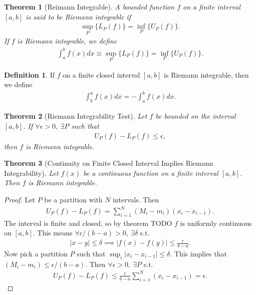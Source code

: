 \documentclass{article}
\newtheorem{theorem}{Theorem}[section]
\numberwithin{theorem}{subsection}
\numberwithin{theorem}{subsubsection}
\numberwithin{lemma}{subsection}
\numberwithin{lemma}{subsubsection}
\theoremstyle{definition}
\newtheorem{definition}{Definition}[section]
\numberwithin{definition}{subsection}
\numberwithin{definition}{subsubsection}
\begin{document}
\begin{theorem}[Reimann Integrable]
    A bounded function $f$ on a finite interval $[a,b]$ is said to be Riemann integrable if
    \begin{gather}
        \sup_{P}\{L_{P}(f)\} = \inf_{P}\{U_{P}(f)\}.
    \end{gather}
    If $f$ is Riemann integrable, we define
    \begin{gather}
        \int_{a}^{b} f(x)dx \equiv \sup_{P}\{L_{P}(f)\} = \inf_{P}\{U_{P}(f)\}.
    \end{gather}
\end{theorem}

\begin{definition}
    If $f$ on a finite closed interval $[a,b]$ is Riemann integrable, then we define
    \begin{gather}
        \int_{b}^{a}f(x)dx = -\int_{a}^{b}f(x)dx.
    \end{gather}
\end{definition}

\begin{theorem}[Riemann Integrability Test]
    Let $f$ be bounded on the interval $[a,b]$. If $\forall \epsilon > 0,\ \exists P$ such that
    \begin{gather}
        U_{P}(f) - L_{P}(f) \leq \epsilon,
    \end{gather}
    then $f$ is Riemann integrable.
\end{theorem}

\begin{theorem}[Continuity on Finite Closed Interval Implies Riemann Integrability]
    Let $f(x)$ be a continuous function on a finite interval $[a,b]$. Then $f$ is Riemann integrable.
\end{theorem}
\begin{proof}
    Let $P$ be a partition with $N$ intervals. Then 
    \begin{gather}
        U_{P}(f) - L_{P}(f) = \sum_{i=1}^{N}(M_{i}-m_{i})(x_{i}-x_{i-1}).
    \end{gather}
    The interval is finite and closed, so by theorem TODO $f$ is uniformly continuous on $[a,b]$. This means $\forall \epsilon/(b-a)>0,\ \exists \delta$ s.t.
    \begin{gather}
        |x-y| \leq \delta \implies |f(x) - f(y)| \leq \frac{\epsilon}{b-a}.
    \end{gather}
    Now pick a partition $P$ such that $\sup_{i}|x_{i}-x_{i-1}| \leq \delta$. This implies that $(M_{i} - m_{i}) \leq \epsilon/(b-a)$. Then $\forall \epsilon>0,\ \exists P$ s.t.
    \begin{gather}
        U_{P}(f)-L_{P}(f) \leq \frac{\epsilon}{b-a}\sum_{i=1}^{N}(x_{i} - x_{i-1}) = \epsilon.
    \end{gather}
\end{proof}
\end{document}
